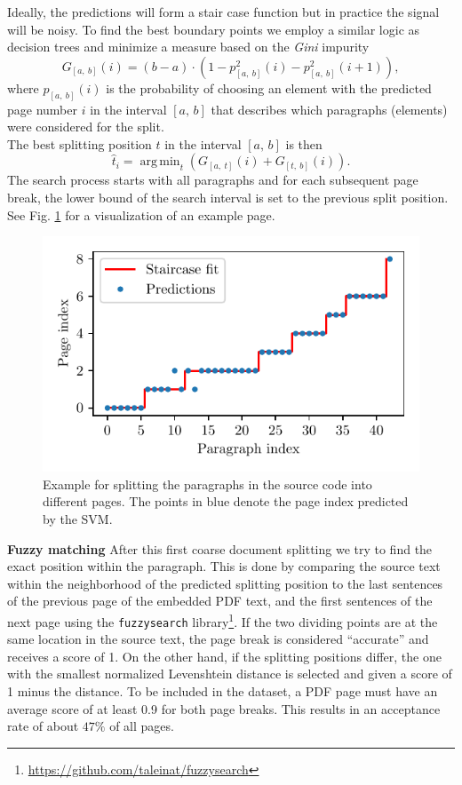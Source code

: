 \documentclass[]{article}
\DeclareMathOperator*{\argmin}{\arg\,\min}
\newcommand{\footurl}[1]{\footnote{\url{#1}}}
\newcommand{\para}[1]{\textbf{#1} \quad}
\begin{document}
Ideally, the predictions will form a stair case function but in practice the signal will be noisy. To find the best boundary points we employ a similar logic as decision trees %
and minimize a measure based on the \emph{Gini} impurity %
\begin{equation*}
    G_{[a,\:\!b]}(i) = (b-a) \cdot \left( 1 - p_{[a,\:\!b]}^2(i)- p_{[a,\:\!b]}^2(i+1)\right),
    \label{eq:gini}
\end{equation*}
where $p_{[a,\:\!b]}(i)$ is the probability of choosing an element with the predicted page number $i$ in the interval $[a,\, b]$ that describes which paragraphs (elements) were considered for the split.\\
The best splitting position $t$ in the interval $[a,\, b]$ is then
\begin{equation*}
    {\hat t}_i = \argmin_t \left(G_{[a,\:\!t]}(i)+G_{[t,\:\!b]}(i) \right).
    \label{eq:splitting_position}
\end{equation*}
The search process starts with all paragraphs and for each subsequent page break, the lower bound of the search interval is set to the previous split position. See Fig. \ref{fig:staircase} for a visualization of an example page.

\begin{figure}
    \centering
    \includegraphics[width=.5\textwidth]{figures/staircase.pdf}
    \caption{Example for splitting the paragraphs in the source code into different pages. The points in blue denote the page index predicted by the SVM. %
    }
    \label{fig:staircase}
\end{figure}

\para{Fuzzy matching}
After this first coarse document splitting we try to find the exact position within the paragraph. This is done by comparing the source text within the neighborhood of the predicted splitting position to the last sentences of the previous page of the embedded PDF text, and the first sentences of the next page using the \verb|fuzzysearch| library\footurl{https://github.com/taleinat/fuzzysearch}. 
If the two dividing points are at the same location in the source text, the page break is considered ``accurate'' and receives a score of 1. On the other hand, if the splitting positions differ, the one with the smallest normalized Levenshtein distance is selected and given a score of 1 minus the distance. To be included in the dataset, a PDF page must have an average score of at least 0.9 for both page breaks. This results in an acceptance rate of about $47\%$ of all pages.%
\end{document}
